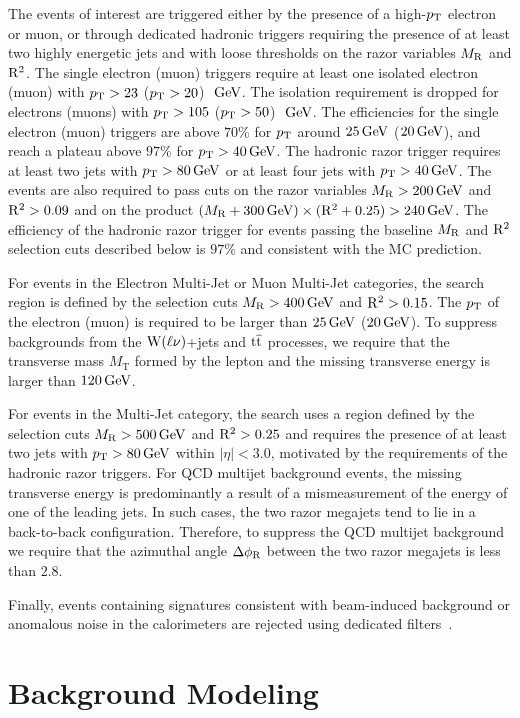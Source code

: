 The events of interest are triggered either by the presence of a high-$p_{\mathrm{T}}$ electron or muon, or 
through dedicated hadronic triggers requiring the presence of at least two highly energetic jets 
and with loose thresholds on the razor variables $M_\mathrm{R}$ and $\mathrm{R}^2$. The single 
electron (muon) triggers require at least one isolated electron 
(muon) with $p_{\mathrm{T}}>23$ ($p_{\mathrm{T}}>20$)~$\,\text{Ge\hspace{-.08em}V}$. The isolation requirement is dropped for electrons (muons) with 
$p_{\mathrm{T}}>105$ ($p_{\mathrm{T}}>50$)~$\,\text{Ge\hspace{-.08em}V}$. The efficiencies for the single electron (muon) triggers
are above $70$\% for $p_{\mathrm{T}}$ around $25 \,\text{Ge\hspace{-.08em}V}$ ($20 \,\text{Ge\hspace{-.08em}V}$), and reach a plateau above $97$\% for $p_{\mathrm{T}}>40 \,\text{Ge\hspace{-.08em}V}$. 
The hadronic razor trigger requires at least two jets with $p_{\mathrm{T}} > 80 \,\text{Ge\hspace{-.08em}V}$ or at least 
four jets with $p_{\mathrm{T}} > 40 \,\text{Ge\hspace{-.08em}V}$. The events are also required to pass cuts on the 
razor variables $M_\mathrm{R}>200\,\text{Ge\hspace{-.08em}V}$ and $\mathrm{R}^2>0.09$ and on the product 
$(M_\mathrm{R} + 300 \,\text{Ge\hspace{-.08em}V})\times(\mathrm{R}^2 + 0.25)>240 \,\text{Ge\hspace{-.08em}V}$.
The efficiency of the hadronic razor trigger for events passing the baseline
$M_\mathrm{R}$ and $\mathrm{R}^2$ selection cuts described below is $97\%$ and consistent with
the MC prediction.

For events in the Electron Multi-Jet or Muon Multi-Jet categories, the search region 
is defined by the selection cuts $M_\mathrm{R} > 400 \,\text{Ge\hspace{-.08em}V}$ and $\mathrm{R}^2 > 0.15$. 
The $p_{\mathrm{T}}$ of the electron (muon)
is required to be larger than $25 \,\text{Ge\hspace{-.08em}V}$ ($20 \,\text{Ge\hspace{-.08em}V}$). To suppress backgrounds from the $\mathrm{W}(\ell\nu)$+jets
and $\mathrm{t}\overline{\mathrm{t}}$ processes, we require that the transverse mass $M_{\mathrm{T}}$ formed by the lepton
and the missing transverse energy is larger than $120 \,\text{Ge\hspace{-.08em}V}$. 

For events in the Multi-Jet category, the search uses a region defined by the 
selection cuts $M_\mathrm{R} > 500 \,\text{Ge\hspace{-.08em}V}$ and $\mathrm{R}^2 > 0.25$ and requires the presence of at least 
two jets with $p_{\mathrm{T}} >80 \,\text{Ge\hspace{-.08em}V}$ within $|\eta|<3.0$, motivated by the requirements 
of the hadronic razor triggers. For QCD multijet background events, the missing transverse 
energy is predominantly a result 
of a mismeasurement of the energy of one of the leading jets.  In such cases, the two razor 
megajets tend to lie in a back-to-back configuration. Therefore, to suppress the QCD multijet 
background we require that the azimuthal angle $\Delta\phi_\mathrm{R}$ between the two razor
megajets is less than $2.8$. 

Finally, events containing signatures consistent with beam-induced background or anomalous noise 
in the calorimeters are rejected using dedicated 
filters~\cite{Chatrchyan:2011tn,Khachatryan:2014gga}.


\section{Background Modeling}
\label{sec:Background}

